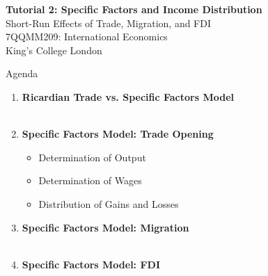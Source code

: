 \documentclass{beamer}
\begin{document}
\begin{frame}

\vspace{1.5cm}

\centering
{\Large \textbf{Tutorial 2: Specific Factors and Income Distribution}} \\[0.5cm]
{\large Short-Run Effects of Trade, Migration, and FDI} \\[1.0cm]

{\small 7QQMM209: International Economics} \\[0.3cm]
{\small King's College London}

\vfill

\end{frame}


\begin{frame}{Agenda}

\begin{enumerate}
    \item \textbf{Ricardian Trade vs. Specific Factors Model} \\~\\
    
    \item \textbf{Specific Factors Model: Trade Opening}
    \begin{itemize}
        \item Determination of Output
        \item Determination of Wages
        \item Distribution of Gains and Losses
    \end{itemize}
    
    \vspace{0.3cm}
    
    \item \textbf{Specific Factors Model: Migration} \\~\\
    
    \item \textbf{Specific Factors Model: FDI}
\end{enumerate}

\end{frame}

\end{document}
